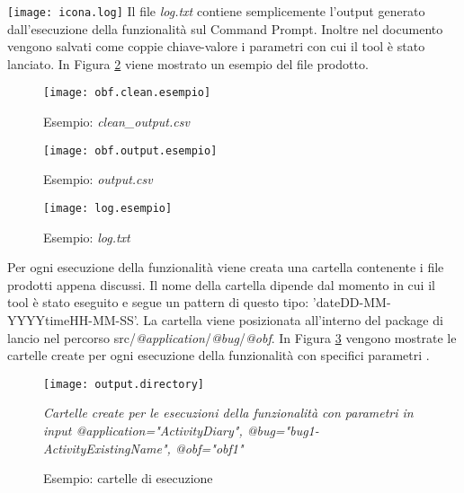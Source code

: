 \begin{tcolorbox}[colback=white, colframe=lightgray]
	 \texttt{[image: icona.log]} \newline
Il file \emph{log.txt} contiene semplicemente l'output generato dall'esecuzione della funzionalità sul Command Prompt. Inoltre nel documento vengono salvati come coppie chiave-valore i parametri con cui il tool è stato lanciato. In Figura \ref{fig:loges} viene mostrato un esempio del file prodotto.  
\end{tcolorbox}

\begin{figure}[H]
    \centering
    \begin{minipage}{0.5\textwidth}
        \centering
        \texttt{[image: obf.clean.esempio]} 
        \caption{Esempio: \emph{clean\_output.csv}}
            \label{fig:obf.clean.es}
    \end{minipage}\hfill
    \begin{minipage}{0.5\textwidth}
        \centering
        \texttt{[image: obf.output.esempio]} 
        \caption{Esempio: \emph{output.csv}}
            \label{fig:obf.output.es}
    \end{minipage}
\end{figure}


\begin{figure}[H]
	\texttt{[image: log.esempio]}
	\centering
	\caption{Esempio: \emph{log.txt}}
    \label{fig:loges}
\end{figure}

\noindent Per ogni esecuzione della funzionalità viene creata una cartella contenente i file prodotti appena discussi. Il nome della cartella dipende dal momento in cui il tool è stato eseguito e segue un pattern di questo tipo: 'dateDD-MM-YYYYtimeHH-MM-SS'. La cartella viene posizionata all'interno del package di lancio nel percorso  src/\emph{@application}/\emph{@bug}/\emph{@obf}.  In Figura \ref{fig:outdir} vengono mostrate le cartelle create per ogni esecuzione della funzionalità con specifici parametri .  

\begin{figure}[H]
	\texttt{[image: output.directory]}
	\centering
	\caption{Esempio: cartelle di esecuzione}
    \label{fig:outdir}
    \emph{Cartelle create per le esecuzioni della funzionalità con parametri in input @application="ActivityDiary", @bug="bug1-ActivityExistingName", @obf="obf1"}
\end{figure}


